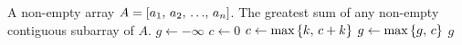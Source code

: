 
\begin{algorithmic}[1]
\Require A non-empty array $A = \left[ {{a}_1},\, {{a}_2},\, {\dots},\, {{a}_{n}} \right]$.
\Ensure The greatest sum of any non-empty contiguous subarray of $A$.
\State $g \gets -\infty$
\State $c \gets 0$
  \State $c \gets \text{max}\left\{{k},\, {c + k}\right\}$
  \State $g \gets \text{max}\left\{{g},\, {c}\right\}$
\EndFor
\State \Return $g$
\end{algorithmic}
